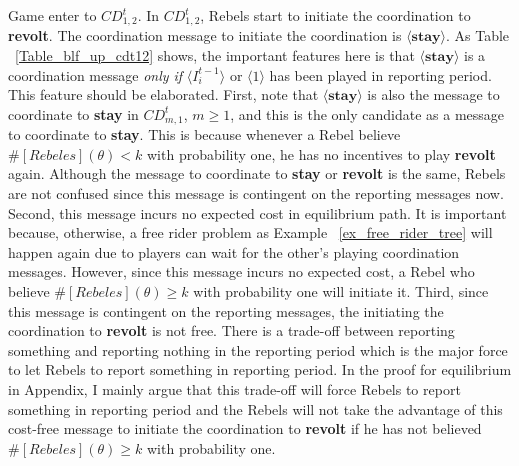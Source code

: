 \documentclass[12pt,letter]{article}
\theoremstyle{definition}
\theoremstyle{remark}
\theoremstyle{claim}
\begin{document}
Game enter to $CD^t_{1,2}$. In $CD^t_{1,2}$, Rebels start to initiate the coordination to \textbf{revolt}. The coordination message to initiate the coordination is $\langle \textbf{stay} \rangle$. As Table ~\ref{Table_blf_up_cdt12} shows, the important features here is that $\langle \textbf{stay} \rangle$ is a coordination message \textit{only if} $\langle  {I^{t-1}_i} \rangle$ or $\langle 1 \rangle$ has been played in reporting period. This feature should be elaborated. First, note that $\langle \textbf{stay} \rangle$ is also the message to coordinate to \textbf{stay} in $CD^t_{m,1}$, $m\geq 1$, and this is the only candidate as a message to coordinate to \textbf{stay}. This is because whenever a Rebel believe $\#[Rebeles](\theta)<k$ with probability one, he has no incentives to play \textbf{revolt} again. Although the message to coordinate to \textbf{stay} or \textbf{revolt} is the same, Rebels are not confused since this message is contingent on the reporting messages now. Second, this message incurs no expected cost in equilibrium path. It is important because, otherwise, a free rider problem as Example ~\ref{ex_free_rider_tree} will happen again due to players can wait for the other's playing coordination messages. However, since this message incurs no expected cost, a Rebel who believe $\#[Rebeles](\theta)\geq k$ with probability one will initiate it. Third, since this message is contingent on the reporting messages, the initiating the coordination to \textbf{revolt} is not free. There is a trade-off between reporting something and reporting nothing in the reporting period which is the major force to let Rebels to report something in reporting period. In the proof for equilibrium in Appendix, I mainly argue that this trade-off will force Rebels to report something in reporting period and the Rebels will not take the advantage of this cost-free message to initiate the coordination to \textbf{revolt} if he has not believed $\#[Rebeles](\theta)\geq k$ with probability one.
\end{document}
